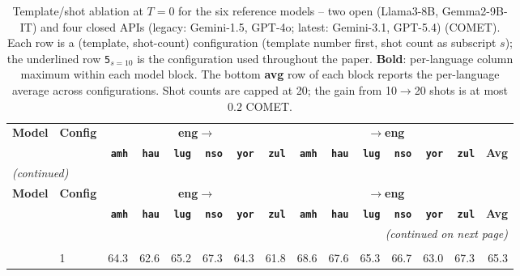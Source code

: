 \begingroup
\footnotesize
\setlength{\tabcolsep}{4pt}
\renewcommand{\arraystretch}{1.05}
\begin{longtable}{llrrrrrrrrrrrrr}
\toprule
\textbf{Model} & \textbf{Config} & \multicolumn{6}{c}{\textbf{eng$\to$}} & \multicolumn{6}{c}{\textbf{$\to$eng}} & \\
\cmidrule(lr){3-8}\cmidrule(lr){9-14}
  &   & \textbf{\texttt{amh}} & \textbf{\texttt{hau}} & \textbf{\texttt{lug}} & \textbf{\texttt{nso}} & \textbf{\texttt{yor}} & \textbf{\texttt{zul}} & \textbf{\texttt{amh}} & \textbf{\texttt{hau}} & \textbf{\texttt{lug}} & \textbf{\texttt{nso}} & \textbf{\texttt{yor}} & \textbf{\texttt{zul}} & \textbf{Avg} \\
\midrule
\endfirsthead
\multicolumn{15}{l}{\textit{(continued)}} \\
\toprule
\textbf{Model} & \textbf{Config} & \multicolumn{6}{c}{\textbf{eng$\to$}} & \multicolumn{6}{c}{\textbf{$\to$eng}} & \\
\cmidrule(lr){3-8}\cmidrule(lr){9-14}
  &   & \textbf{\texttt{amh}} & \textbf{\texttt{hau}} & \textbf{\texttt{lug}} & \textbf{\texttt{nso}} & \textbf{\texttt{yor}} & \textbf{\texttt{zul}} & \textbf{\texttt{amh}} & \textbf{\texttt{hau}} & \textbf{\texttt{lug}} & \textbf{\texttt{nso}} & \textbf{\texttt{yor}} & \textbf{\texttt{zul}} & \textbf{Avg} \\
\midrule
\endhead
\midrule
\multicolumn{15}{r}{\textit{(continued on next page)}} \\
\endfoot
\bottomrule
\caption{Template/shot ablation at $T{=}0$ for the six reference models -- two open (Llama3-8B, Gemma2-9B-IT) and four closed APIs (legacy: Gemini-1.5, GPT-4o; latest: Gemini-3.1, GPT-5.4) (COMET). Each row is a (template, shot-count) configuration (template number first, shot count as subscript $s$); the underlined row \texttt{5}$_{s=10}$ is the configuration used throughout the paper. \textbf{Bold}: per-language column maximum within each model block. The bottom \textbf{avg} row of each block reports the per-language average across configurations. Shot counts are capped at 20; the gain from 10$\to$20 shots is at most $0.2$ COMET.} \label{tab:template_shot_ablation_comet} \\
\endlastfoot
\multirow{10}{*}{\rotatebox{90}{Gemini-1.5}} & 1 & 64.3 & 62.6 & 65.2 & 67.3 & 64.3 & 61.8 & 68.6 & 67.6 & 65.3 & 66.7 & 63.0 & 67.3 & 65.3 \\

\end{longtable}
